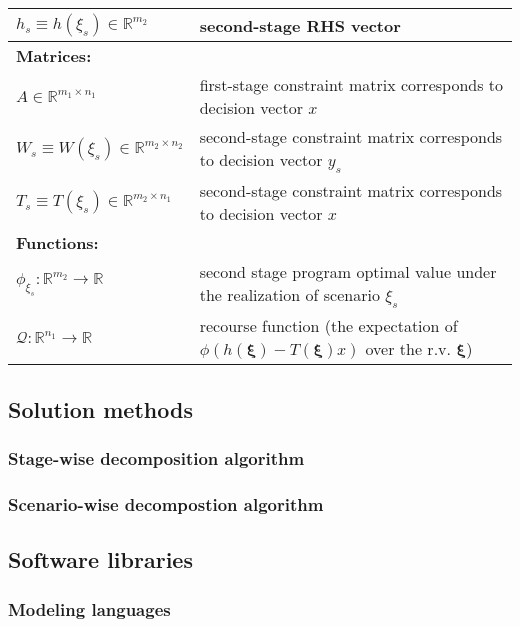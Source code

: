 \begin{table}[H]
{\begin{tabular}{ll}
			$h_s\equiv h(\xi_s)\in\mathbb{R}^{m_2}$	& second-stage RHS vector\\ \midrule
			\multicolumn{2}{l}{\textbf{Matrices:}} \\  
			$A\in\mathbb{R}^{m_1\times n_1}$	& first-stage constraint matrix corresponds to decision vector $x$\\
			$W_s\equiv W(\xi_s)\in\mathbb{R}^{m_2\times n_2}$	& second-stage constraint matrix corresponds to decision vector $y_s$\\
			$T_s\equiv T(\xi_s)\in\mathbb{R}^{m_2\times n_1}$	& second-stage constraint matrix corresponds to decision vector $x$\\ \midrule
			\multicolumn{2}{l}{\textbf{Functions:}} \\
			$\phi_{\xi_s}:\mathbb{R}^{m_2}\to\mathbb{R}$	& second stage program optimal value under the realization of scenario $\xi_s$	\\
			$\mathcal{Q}:\mathbb{R}^{n_1}\to\mathbb{R}$	& recourse function (the expectation of $\phi\left( h(\pmb{\xi})-T(\pmb{\xi})x \right)$ over the r.v. $\pmb{\xi}$) 	\\
			\bottomrule
		\end{tabular}
	}
\end{table} 


\subsection{Solution methods}
\subsubsection{Stage-wise decomposition algorithm}
\subsubsection{Scenario-wise decompostion algorithm}

\subsection{Software libraries}
\subsubsection{Modeling languages}
